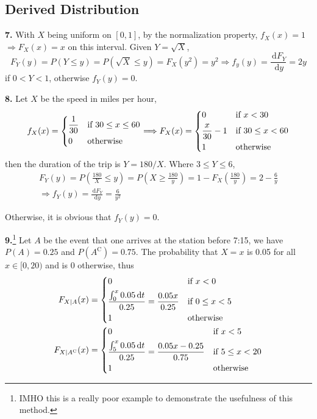 \documentclass[a4paper,12pt]{article}
\newcommand{\C}{\mathrm C}
\newcommand{\ud}{\,\mathrm{d}}
\newcommand{\exercise}[1]{\noindent\textbf{#1.}}
\begin{document}
\subsection{Derived Distribution}
\exercise 7  With $X$ being uniform on $[0, 1]$, by the normalization property,
$f_X(x) = 1$ $\Longrightarrow F_X(x) = x$ on this interval.  Given $Y = \sqrt X$,
\[F_Y(y) = P(Y \le y) = P\left(\sqrt X \le y\right) = F_X\left(y^2\right) = y^2
\Longrightarrow f_y(y) = \frac{\ud F_Y}{\ud y} = 2y\]
if $0 < Y < 1$, otherwise $f_Y(y) = 0$.

\exercise 8  Let $X$ be the speed in miles per hour,
\[f_X(x) = \begin{dcases}
  \frac{1}{30} &\text{if }30 \le x \le 60\\
  0 &\text{otherwise}
\end{dcases}
\Longrightarrow F_X(x) = \begin{dcases}
  0 &\text{if }x < 30\\
  \frac{x}{30} - 1 &\text{if }30 \le x < 60\\
  1 &\text{otherwise}
\end{dcases}\]
then the duration of the trip is $Y = 180/X$.  Where $3 \le Y \le 6$,
\begin{multline*}
  F_Y(y) = P\left(\frac{180}{X} \le y\right)
  = P\left(X \ge \frac{180}{y}\right)
  = 1 - F_X\left(\frac{180}{y}\right) = 2 - \frac{6}{y}\\
  \Longrightarrow f_Y(y) = \frac{\ud F_Y}{\ud y} = \frac{6}{y^2}
\end{multline*}

Otherwise, it is obvious that $f_Y(y) = 0$.

\exercise{9}\footnote{IMHO this is a really poor example to demonstrate
the usefulness of this method.} Let $A$ be the event that one arrives at
the station before 7:15, we have $P(A) = 0.25$ and $P\left(A^\C\right) = 0.75$.
The probability that $X = x$ is 0.05 for all $x \in [0, 20)$
and is 0 otherwise, thus
\begin{align*}
  F_{X|A}(x) &= \begin{dcases}
    0 &\text{if }x < 0\\
    \frac{\int_0^x 0.05\ud t}{0.25} = \frac{0.05x}{0.25}
    &\text{if }0 \le x < 5\\
    1 &\text{otherwise}
  \end{dcases}\\
  F_{X|A^\C}(x) &= \begin{dcases}
    0 &\text{if }x < 5\\
    \frac{\int_5^x 0.05\ud t}{0.25} = \frac{0.05x - 0.25}{0.75}
    &\text{if }5 \le x < 20\\
    1 &\text{otherwise}
  \end{dcases}
\end{align*}
\end{document}
